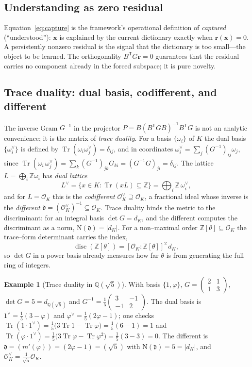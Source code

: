 \documentclass[11pt]{article}
\theoremstyle{plain}
\theoremstyle{definition}
\newtheorem{example}[theorem]{Example}
\theoremstyle{remark}
\newcommand{\Q}{\mathbb{Q}}
\newcommand{\Z}{\mathbb{Z}}
\newcommand{\K}{K}
\newcommand{\OK}{\mathcal{O}_K}
\newcommand{\Tr}{\operatorname{Tr}}
\newcommand{\rr}{\mathbf{r}}
\newcommand{\xx}{\mathbf{x}}
\newcommand{\GG}{G}
\newcommand{\BB}{B}
\newcommand{\transpose}{^{\mathsf{T}}}
\newcommand{\inv}{^{-1}}
\DeclareMathOperator{\disc}{disc}
\begin{document}
\subsection{Understanding as zero residual}
Equation~\eqref{eq:capture} is the framework's operational definition of \emph{captured} (``understood''):
$\xx$ is explained by the current dictionary exactly when $\rr(\xx)=0$. A persistently nonzero residual is
the signal that the dictionary is too small---the object to be learned. The orthogonality
$\BB\transpose\GG\rr=0$ guarantees that the residual carries no component already in the forced subspace; it
is pure novelty.

\subsection{Trace duality: dual basis, codifferent, and different}\label{subsec:dual}
The inverse Gram $\GG\inv$ in the projector $P=\BB(\BB\transpose\GG\BB)\inv\BB\transpose\GG$ is not an
analytic convenience; it is the matrix of \emph{trace duality}. For a basis $\{\omega_i\}$ of $\K$ the dual
basis $\{\omega_i^\vee\}$ is defined by $\Tr(\omega_i\omega_j^\vee)=\delta_{ij}$, and in coordinates
$\omega_i^\vee=\sum_j(\GG\inv)_{ij}\omega_j$, since
$\Tr(\omega_i\,\omega_j^\vee)=\sum_k(\GG\inv)_{jk}\GG_{ki}=(\GG\inv\GG)_{ji}=\delta_{ij}$. The lattice
$L=\bigoplus_i\Z\omega_i$ has \emph{dual lattice}
\[
  L^\vee=\{x\in\K:\Tr(xL)\subseteq\Z\}=\bigoplus_i\Z\,\omega_i^\vee,
\]
and for $L=\OK$ this is the \emph{codifferent} $\OK^\vee\supseteq\OK$, a fractional ideal whose inverse is
the \emph{different} $\mathfrak d=(\OK^\vee)\inv\subseteq\OK$. Trace duality binds the metric to the
discriminant: for an integral basis $\det\GG=d_\K$, and the different computes the discriminant as a norm,
$\mathrm N(\mathfrak d)=|d_\K|$. For a non--maximal order $\Z[\theta]\subseteq\OK$ the trace--form
determinant carries the index,
\[
  \disc(\Z[\theta])=[\OK:\Z[\theta]]^2\,d_\K ,
\]
so $\det\GG$ in a power basis already measures how far $\theta$ is from generating the full ring of integers.

\begin{example}[Trace duality in $\Q(\sqrt5)$]\label{ex:dual}
With basis $\{1,\varphi\}$, $\GG=\left(\begin{smallmatrix}2&1\\1&3\end{smallmatrix}\right)$,
$\det\GG=5=d_{\Q(\sqrt5)}$ and $\GG\inv=\tfrac15\left(\begin{smallmatrix}3&-1\\-1&2\end{smallmatrix}\right)$.
The dual basis is $1^\vee=\tfrac15(3-\varphi)$ and $\varphi^\vee=\tfrac15(2\varphi-1)$; one checks
$\Tr(1\cdot 1^\vee)=\tfrac15\big(3\Tr 1-\Tr\varphi\big)=\tfrac15(6-1)=1$ and
$\Tr(\varphi\cdot 1^\vee)=\tfrac15\big(3\Tr\varphi-\Tr\varphi^2\big)=\tfrac15(3-3)=0$. The different is
$\mathfrak d=(m'(\varphi))=(2\varphi-1)=(\sqrt5)$ with $\mathrm N(\mathfrak d)=5=|d_\K|$, and
$\OK^\vee=\tfrac1{\sqrt5}\OK$.
\end{example}
\end{document}
